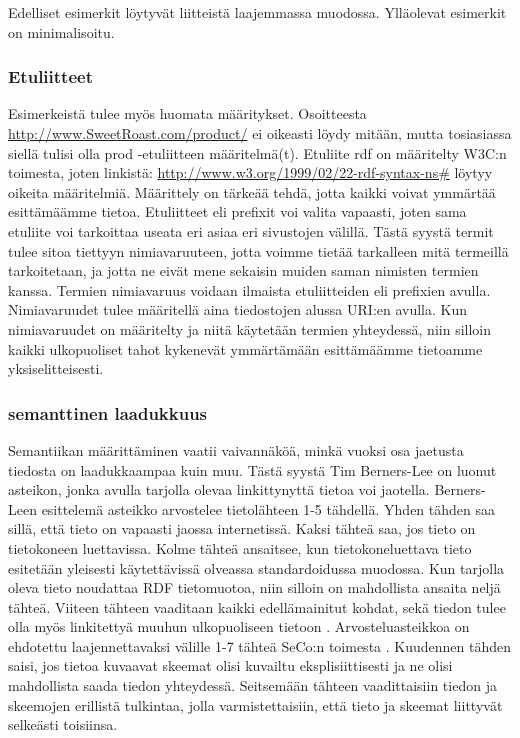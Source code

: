 \documentclass[finnish, 12pt, a4paper, elec, utf8, pdfa, online]{aaltothesis}
\begin{document}
Edelliset esimerkit löytyvät liitteistä laajemmassa muodossa. Ylläolevat esimerkit on minimalisoitu.


\subsubsection{Etuliitteet}
Esimerkeistä tulee myös huomata määritykset. Osoitteesta \url{http://www.SweetRoast.com/product/} ei oikeasti löydy mitään, mutta tosiasiassa siellä tulisi olla prod -etuliitteen määritelmä(t). Etuliite rdf on määritelty W3C:n toimesta, joten linkistä: \url{http://www.w3.org/1999/02/22-rdf-syntax-ns#} löytyy oikeita määritelmiä. Määrittely on tärkeää tehdä, jotta kaikki voivat ymmärtää esittämäämme tietoa. Etuliitteet eli prefixit voi valita vapaasti, joten sama etuliite voi tarkoittaa useata eri asiaa eri sivustojen välillä. Tästä syystä termit tulee sitoa tiettyyn nimiavaruuteen, jotta voimme tietää tarkalleen mitä termeillä tarkoitetaan, ja jotta ne eivät mene sekaisin muiden saman nimisten termien kanssa. Termien nimiavaruus voidaan ilmaista etuliitteiden eli prefixien avulla. Nimiavaruudet tulee määritellä aina tiedostojen alussa URI:en avulla. Kun nimiavaruudet on määritelty ja niitä käytetään termien yhteydessä, niin silloin kaikki ulkopuoliset tahot kykenevät ymmärtämään esittämäämme tietoamme yksiselitteisesti.



\subsubsection{semanttinen laadukkuus}
Semantiikan määrittäminen vaatii vaivannäköä, minkä vuoksi osa jaetusta tiedosta on laadukkaampaa kuin muu. Tästä syystä Tim Berners-Lee on luonut asteikon, jonka avulla tarjolla olevaa linkittynyttä tietoa voi jaotella. Berners-Leen esittelemä asteikko arvostelee tietolähteen 1-5 tähdellä. Yhden tähden saa sillä, että tieto on vapaasti jaossa internetissä. Kaksi tähteä saa, jos tieto on tietokoneen luettavissa. Kolme tähteä ansaitsee, kun tietokoneluettava tieto esitetään yleisesti käytettävissä olveassa standardoidussa muodossa. Kun tarjolla oleva tieto noudattaa RDF tietomuotoa, niin silloin on mahdollista ansaita neljä tähteä. Viiteen tähteen vaaditaan kaikki edellämainitut kohdat, sekä tiedon tulee olla myös linkitettyä muuhun ulkopuoliseen tietoon \cite{Tim-BL}. Arvosteluasteikkoa on ehdotettu laajennettavaksi välille 1-7 tähteä SeCo:n toimesta \cite{SeCo_stars}. Kuudennen tähden saisi, jos tietoa kuvaavat skeemat olisi kuvailtu eksplisiittisesti ja ne olisi mahdollista saada tiedon yhteydessä. Seitsemään tähteen vaadittaisiin tiedon ja skeemojen erillistä tulkintaa, jolla varmistettaisiin, että tieto ja skeemat liittyvät selkeästi toisiinsa.
\end{document}
